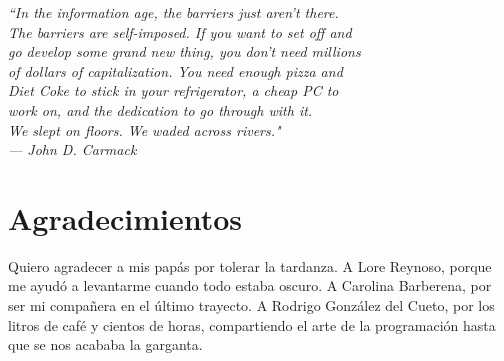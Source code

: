 
\begin{flushright}{\slshape
        ``In the information age, the barriers just aren't there. \\
        The barriers are self-imposed. If you want to set off and\\
        go develop some grand new thing, you don't need millions \\
        of dollars of capitalization. You need enough pizza and  \\
        Diet Coke to stick in your refrigerator, a cheap PC to   \\
        work on, and the dedication to go through with it.       \\
        We slept on floors.  We waded across rivers."            \\
    --- \textit{John D. Carmack}}
\end{flushright}



\bigskip

\begingroup
\let\clearpage\relax
\let\cleardoublepage\relax
\let\cleardoublepage\relax
\chapter*{Agradecimientos}

Quiero agradecer a mis papás por tolerar la tardanza. A Lore Reynoso, porque me ayudó a levantarme cuando todo estaba oscuro. A Carolina Barberena, por ser mi compañera en el último trayecto. A Rodrigo González del Cueto, por los litros de café y cientos de horas, compartiendo el arte de la programación hasta que se nos acababa la garganta.

\bigskip


\endgroup


